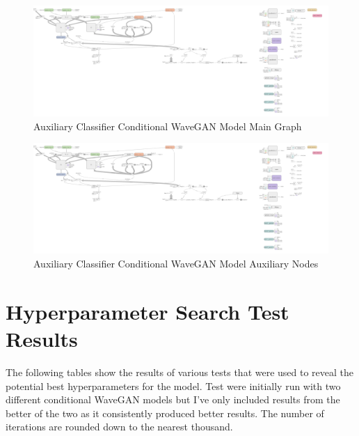 \documentclass[a4paper, titlepage]{article}
\begin{document}
\begin{appendices}
  \begin{figure}[ht]
    \caption{Auxiliary Classifier Conditional WaveGAN Model Main Graph}
    \centering
    \includegraphics[width=1.25\textwidth, angle=90, trim={0 0 50cm 0}, clip]{ACGAN}
  \end{figure}
  
  \clearpage

  \begin{figure}[ht]
    \caption{Auxiliary Classifier Conditional WaveGAN Model Auxiliary Nodes}
    \centering
    \includegraphics[width=1\textwidth, trim={150cm 0 0 0}, clip]{ACGAN}
  \end{figure}
  \clearpage
  
  \section{Hyperparameter Search Test Results}

  The following tables show the results of various tests that were used to reveal the potential best hyperparameters for the model.
  \newline
  \newline
  Test were initially run with two different conditional WaveGAN models but I've only included results from the better of the two as it consistently produced better results.
  The number of iterations are rounded down to the nearest thousand.
  
  \begin{table}[ht]
    

\end{table}
\end{appendices}
\end{document}
